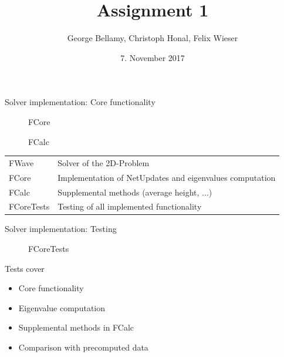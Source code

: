 \documentclass[shortpres]{beamer}
\title[{Tsunami simulation}]{Assignment 1}
\author[Bellamy Honal, Wieser]{George Bellamy, Christoph Honal, Felix Wieser\\\vspace{10pt}{\small Bachelorpraktikum}}
\institute[TU M\"unchen]{Techncal University of Munich}
\date{7. November 2017}
\begin{document}
\maketitle

\begin{frame}{Solver implementation: Core functionality}
	\begin{multicols}{2}
		\begin{figure}[t]
%			
			\caption*{FCore}			
		\end{figure}

		\columnbreak
		
		\begin{figure}[t]
%			
			\caption*{FCalc}
		\end{figure}
		
	\end{multicols}
	\begin{tabular}{ll}
		FWave & Solver of the 2D-Problem\\
		FCore & Implementation of NetUpdates and eigenvalues computation\\
		FCalc & Supplemental methods (average height, ...)\\
		FCoreTests & Testing of all implemented functionality
	\end{tabular}
\end{frame}

\begin{frame}{Solver implementation: Testing}
	\begin{multicols}{2}
		
		\begin{figure}
%			
			\caption*{FCoreTests}
		\end{figure}
		
		\columnbreak
		
		Tests cover
		\begin{itemize}
			\item Core functionality
			\item Eigenvalue computation
			\item Supplemental methods in FCalc
			\item Comparison with precomputed data
		\end{itemize}
	\end{multicols}
\end{frame}
\end{document}
